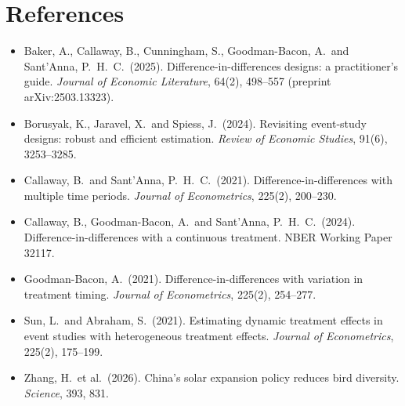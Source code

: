 \documentclass[11pt]{article}
\begin{document}
\section*{References}
{\small
\begin{itemize}[leftmargin=12pt,label={}]
\item Baker, A., Callaway, B., Cunningham, S., Goodman-Bacon, A.\ and Sant'Anna, P.\ H.\ C.\ (2025). Difference-in-differences designs: a practitioner's guide. \textit{Journal of Economic Literature}, 64(2), 498--557 (preprint arXiv:2503.13323).
\item Borusyak, K., Jaravel, X.\ and Spiess, J.\ (2024). Revisiting event-study designs: robust and efficient estimation. \textit{Review of Economic Studies}, 91(6), 3253--3285.
\item Callaway, B.\ and Sant'Anna, P.\ H.\ C.\ (2021). Difference-in-differences with multiple time periods. \textit{Journal of Econometrics}, 225(2), 200--230.
\item Callaway, B., Goodman-Bacon, A.\ and Sant'Anna, P.\ H.\ C.\ (2024). Difference-in-differences with a continuous treatment. NBER Working Paper 32117.
\item Goodman-Bacon, A.\ (2021). Difference-in-differences with variation in treatment timing. \textit{Journal of Econometrics}, 225(2), 254--277.
\item Sun, L.\ and Abraham, S.\ (2021). Estimating dynamic treatment effects in event studies with heterogeneous treatment effects. \textit{Journal of Econometrics}, 225(2), 175--199.
\item Zhang, H.\ et al.\ (2026). China's solar expansion policy reduces bird diversity. \textit{Science}, 393, 831.
\end{itemize}}
\end{document}
